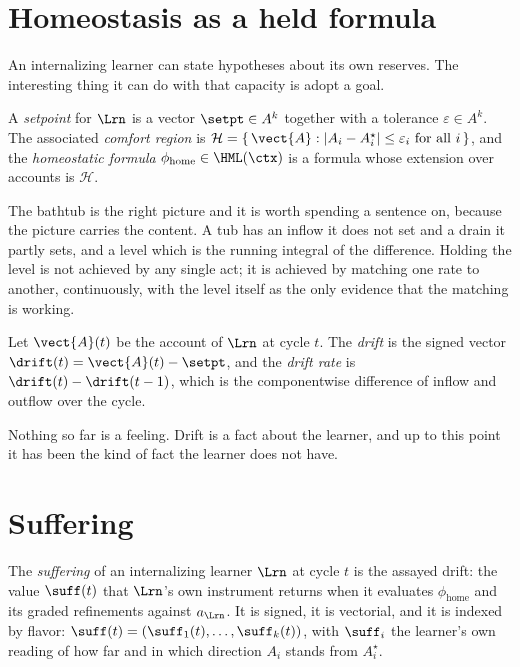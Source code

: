 \section{Homeostasis as a held formula}
\label{suf:S2}

An internalizing learner can state hypotheses about its own reserves.
The interesting thing it can do with that capacity is adopt a goal.

\begin{definition}
\label{suf:def:setpoint}
A \emph{setpoint} for $\Lrn$ is a vector $\setpt \in A^k$ together with a
tolerance $\varepsilon \in A^k$.
The associated \emph{comfort region} is
$\mathcal{H} = \{\, \vect{A} : |A_i - A^\star_i| \leq \varepsilon_i
\text{ for all } i \,\}$,
and the \emph{homeostatic formula} $\phi_{\mathrm{home}} \in \HML(\ctx)$
is a formula whose extension over accounts is $\mathcal{H}$.
\end{definition}

The bathtub is the right picture and it is worth spending a sentence on,
because the picture carries the content.
A tub has an inflow it does not set and a drain it partly sets, and a
level which is the running integral of the difference.
Holding the level is not achieved by any single act; it is achieved by
matching one rate to another, continuously, with the level itself as the
only evidence that the matching is working.

\begin{definition}[Drift]
\label{suf:def:drift}
Let $\vect{A}(t)$ be the account of $\Lrn$ at cycle $t$.
The \emph{drift} is the signed vector
$\drift(t) = \vect{A}(t) - \setpt$,
and the \emph{drift rate} is $\drift(t) - \drift(t-1)$, which is the
componentwise difference of inflow and outflow over the cycle.
\end{definition}

Nothing so far is a feeling.
Drift is a fact about the learner, and up to this point it has been the
kind of fact the learner does not have.

\section{Suffering}
\label{suf:S3}

\begin{definition}[Suffering]
\label{suf:def:suffering}
The \emph{suffering} of an internalizing learner $\Lrn$ at cycle $t$ is
the assayed drift: the value $\suff(t)$ that $\Lrn$'s own instrument
returns when it evaluates $\phi_{\mathrm{home}}$ and its graded
refinements against $a_\Lrn$.
It is signed, it is vectorial, and it is indexed by flavor:
$\suff(t) = (\suff_1(t),\ldots,\suff_k(t))$, with $\suff_i$ the learner's
own reading of how far and in which direction $A_i$ stands from
$A^\star_i$.
\end{definition}

